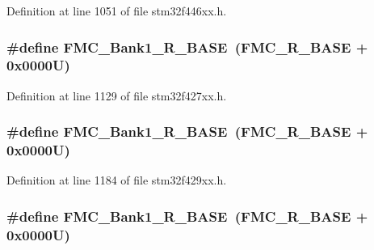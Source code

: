 Definition at line 1051 of file stm32f446xx.\+h.

\subsubsection[{\texorpdfstring{F\+M\+C\+\_\+\+Bank1\+\_\+\+R\+\_\+\+B\+A\+SE}{FMC_Bank1_R_BASE}}]{\setlength{\rightskip}{0pt plus 5cm}\#define F\+M\+C\+\_\+\+Bank1\+\_\+\+R\+\_\+\+B\+A\+SE~({\bf F\+M\+C\+\_\+\+R\+\_\+\+B\+A\+SE} + 0x0000\+U)}\hypertarget{group___peripheral__memory__map_ga1d581e6f64ed2e5d97c11c58285a21b6}{}\label{group___peripheral__memory__map_ga1d581e6f64ed2e5d97c11c58285a21b6}


Definition at line 1129 of file stm32f427xx.\+h.

\subsubsection[{\texorpdfstring{F\+M\+C\+\_\+\+Bank1\+\_\+\+R\+\_\+\+B\+A\+SE}{FMC_Bank1_R_BASE}}]{\setlength{\rightskip}{0pt plus 5cm}\#define F\+M\+C\+\_\+\+Bank1\+\_\+\+R\+\_\+\+B\+A\+SE~({\bf F\+M\+C\+\_\+\+R\+\_\+\+B\+A\+SE} + 0x0000\+U)}\hypertarget{group___peripheral__memory__map_ga1d581e6f64ed2e5d97c11c58285a21b6}{}\label{group___peripheral__memory__map_ga1d581e6f64ed2e5d97c11c58285a21b6}


Definition at line 1184 of file stm32f429xx.\+h.

\subsubsection[{\texorpdfstring{F\+M\+C\+\_\+\+Bank1\+\_\+\+R\+\_\+\+B\+A\+SE}{FMC_Bank1_R_BASE}}]{\setlength{\rightskip}{0pt plus 5cm}\#define F\+M\+C\+\_\+\+Bank1\+\_\+\+R\+\_\+\+B\+A\+SE~({\bf F\+M\+C\+\_\+\+R\+\_\+\+B\+A\+SE} + 0x0000\+U)}\hypertarget{group___peripheral__memory__map_ga1d581e6f64ed2e5d97c11c58285a21b6}{}\label{group___peripheral__memory__map_ga1d581e6f64ed2e5d97c11c58285a21b6}


